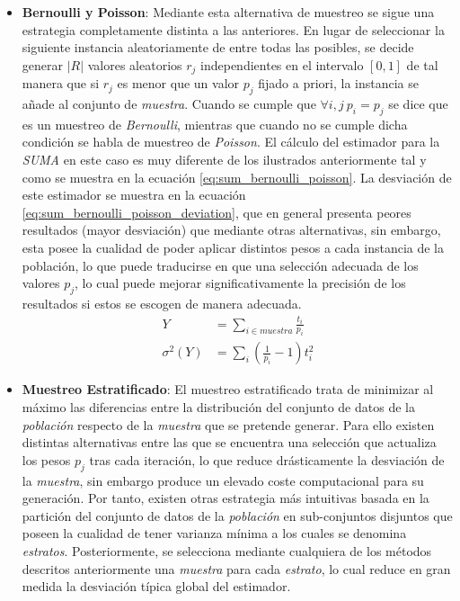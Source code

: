 \documentclass{subfiles}
\begin{document}
\begin{itemize}
          \item \textbf{Bernoulli y Poisson}: Mediante esta alternativa de muestreo se sigue una estrategia completamente distinta a las anteriores. En lugar de seleccionar la siguiente instancia aleatoriamente de entre todas las posibles, se decide generar $|R|$ valores aleatorios $r_j$ independientes en el intervalo $[0,1]$ de tal manera que si $r_j$ es menor que un valor $p_j$ fijado a priori, la instancia se añade al conjunto de \emph{muestra}. Cuando se cumple que $\forall i, j \ p_i = p_j$ se dice que es un muestreo de \emph{Bernoulli}, mientras que cuando no se cumple dicha condición se habla de muestreo de \emph{Poisson}. El cálculo del estimador para la \emph{SUMA} en este caso es muy diferente de los ilustrados anteriormente tal y como se muestra en la ecuación \eqref{eq:sum_bernoulli_poisson}. La desviación de este estimador se muestra en la ecuación \eqref{eq:sum_bernoulli_poisson_deviation}, que en general presenta peores resultados (mayor desviación) que mediante otras alternativas, sin embargo, esta posee la cualidad de poder aplicar distintos pesos a cada instancia de la población, lo que puede traducirse en que una selección adecuada de los valores $p_j$, lo cual puede mejorar significativamente la precisión de los resultados si estos se escogen de manera adecuada.
            \begin{align}
            \label{eq:sum_bernoulli_poisson}
              Y &= \sum_{i \in muestra }\frac{t_i}{p_i} \\
            \label{eq:sum_bernoulli_poisson_deviation}
              \sigma^2(Y) &= \sum_i(\frac{1}{p_i}-1)t_i^2
            \end{align}

          \item \textbf{Muestreo Estratificado}: El muestreo estratificado trata de minimizar al máximo las diferencias entre la distribución del conjunto de datos de la \emph{población} respecto de la \emph{muestra} que se pretende generar. Para ello existen distintas alternativas entre las que se encuentra una selección que  actualiza los pesos $p_j$ tras cada iteración, lo que reduce drásticamente la desviación de la \emph{muestra}, sin embargo produce un elevado coste computacional para su generación. Por tanto, existen otras estrategia más intuitivas basada en la partición del conjunto de datos de la \emph{población} en sub-conjuntos disjuntos que poseen la cualidad de tener varianza mínima a los cuales se denomina \emph{estratos}. Posteriormente, se selecciona mediante cualquiera de los métodos descritos anteriormente una \emph{muestra} para cada \emph{estrato}, lo cual reduce en gran medida la desviación típica global del estimador.

        \end{itemize}
\end{document}
